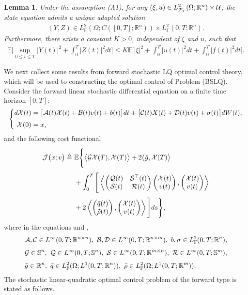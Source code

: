 \documentclass[11pt,times,twoside]{article}
\def\dbE{\mathbb{E}} \def\sE{\mathscr{E}} \def\fE{\mathfrak{E}} \def\cE{{\cal E}} \def\BE{{\bf E}} \def\Be{{\bf e}}
\def\dbF{\mathbb{F}} \def\sF{\mathscr{F}} \def\fF{\mathfrak{F}} \def\cF{{\cal F}} \def\BF{{\bf F}} \def\Bf{{\bf f}}
\def\dbR{\mathbb{R}} \def\sR{\mathscr{R}} \def\fR{\mathfrak{R}} \def\cR{{\cal R}} \def\BR{{\bf R}} \def\Br{{\bf r}}
\def\dbS{\mathbb{S}} \def\sS{\mathscr{S}} \def\fS{\mathfrak{S}} \def\cS{{\cal S}} \def\BS{{\bf S}} \def\Bs{{\bf s}}
\def\Om{\Omega}      \def\Lm{\Lambda}     \def\Th{\Theta}
\def\nn{\nonumber}        \def\La{\mathop{\Leftarrow}}       \def\ran{\rangle}
\def\ts{\times}           \def\qq{\qquad}                    \def\rran{\right\rangle}
\def\les{\leqslant}       \def\as{\hbox{\rm a.s.}}           \def\){\Big )}
\def\bel{\begin{equation}\label}      \def\ee{\end{equation}}
\def\ba{\begin{aligned}}              \def\ea{\end{aligned}}
\newtheorem{lemma}[theorem]{Lemma}
\begin{document}
\begin{lemma}\label{estimate}
Under the assumption (A1), for any $(\xi,u)\in L^2_{\cF_T}(\Om;\dbR^n)\ts \cU$, the state equation  admits a unique adapted solution
%
\begin{align*}
  (Y,Z)\in L^2_{\dbF}(\Om;C([0,T];\dbR^n))\ts L^2_{\dbF}(0,T;\dbR^n).
\end{align*}
%
Furthermore, there exists a constant $K>0$, independent of $\xi$ and $u$, such that
%
\begin{align*}
\dbE\bigg[\sup_{0\les t\les T}|Y(t)|^2+\int_0^T|Z(t)|^2dt\bigg]\les
K\dbE\bigg[|\xi|^2+\int_0^T|u(t)|^2dt+\int_0^T|f(t)|^2dt\bigg].
\end{align*}
%
\end{lemma}
%
We next collect some results from forward stochastic LQ optimal control theory, which will be used to constructing the optimal control of Problem (BSLQ). Consider the forward linear stochastic differential equation on a finite time horizon $[0,T]$:
%
\bel{SDE}\left\{\ba
\ds d\cX(t) &=\big[\cA(t)\cX(t)+\cB(t)v(t)+b(t)\big]dt
+\big[\cC(t)X(t)+\cD(t)v(t)+\sigma(t)\big]dW(t), \\
%
\ns\ds \cX(0) &=x,
\ea\right.\ee
%
and the following cost functional
%
%
\begin{align}\label{cost-SDE}
\ds \cJ\big(x;v\big)\deq&~\dbE\Bigg\{\big\lan \cG\cX(T),\cX(T)\big\ran
+2\big\lan \tilde{g},\cX(T)\big\ran \nonumber \\
%
\ns\ds &~ +\int_0^T\Bigg[
\llan\begin{pmatrix}\cQ(t)&\cS^\top(t)\\\cS(t)&\cR(t) \end{pmatrix}
\begin{pmatrix}\cX(t)\\v(t)\end{pmatrix},
\begin{pmatrix}\cX(t)\\v(t)\end{pmatrix}\rran \\
%
\ns\ds &~ +2\llan\begin{pmatrix}\tilde{q}(t)\\ \tilde{\rho}(t)\end{pmatrix},
   \begin{pmatrix}\cX(t)\\ v(t)\end{pmatrix}\rran\Bigg] ds\Bigg\}, \nonumber
%
\end{align}
%
where in the equations  and ,
%
\begin{align*}
%
\ds &\cA,\cC\in L^{\i}(0,T;\dbR^{n\ts n}),\ \cB,\cD\in L^{\i}(0,T;\dbR^{n\ts m}),\
  b,\sigma\in L^2_{\dbF}(0,T;\dbR^n), \nn \\
%
\ns\ds &\cG\in\dbS^n,\ \cQ\in L^{\i}(0,T;\dbS^n),\ \cS\in L^{\i}(0,T;\dbR^{m\ts n}),\
 \cR\in L^{\i}(0,T;\dbS^{m}),\nn \\
%
\ns\ds & \tilde{g}\in \dbR^n,\ \tilde{q}\in L^2_{\dbF}(\Om;L^1(0,T;\dbR^n)),\ \tilde{\rho}\in L^2_{\dbF}(\Om;L^1(0,T;\dbR^m)).\nn
%
\end{align*}
The stochastic linear-quadratic optimal control problem of the forward type is stated as follows.
\end{document}
